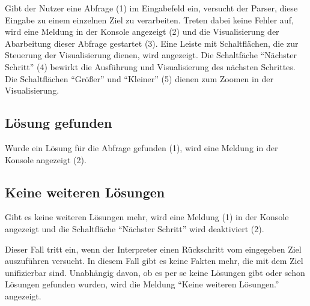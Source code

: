 \documentclass[parskip=full,11pt,twoside]{scrartcl}
\begin{document}
\begin{minipage}{\linewidth}
\end{minipage}

Gibt der Nutzer eine Abfrage (1) im Eingabefeld ein, versucht der Parser, diese Eingabe zu einem einzelnen Ziel zu verarbeiten.
Treten dabei keine Fehler auf, wird eine Meldung in der Konsole angezeigt (2) und die Visualisierung der Abarbeitung dieser Abfrage gestartet (3).
Eine Leiste mit Schaltflächen, die zur Steuerung der Visualisierung dienen, wird angezeigt.
Die Schaltfäche \enquote{Nächster Schritt} (4) bewirkt die Ausführung und Visualisierung des nächsten Schrittes.
Die Schaltflächen \enquote{Größer} und \enquote{Kleiner} (5) dienen zum Zoomen in der Visualisierung.

\subsection{Lösung gefunden}

\begin{minipage}{\linewidth}
\end{minipage}

Wurde ein Lösung für die Abfrage gefunden (1), wird eine Meldung in der Konsole angezeigt (2).

\subsection{Keine weiteren Lösungen}

\begin{minipage}{\linewidth}
\end{minipage}

Gibt es keine weiteren Lösungen mehr, wird eine Meldung (1) in der Konsole angezeigt und die Schaltfläche \enquote{Nächster Schritt} wird deaktiviert (2).

Dieser Fall tritt ein, wenn der Interpreter einen Rückschritt vom eingegeben Ziel auszuführen versucht.
In diesem Fall gibt es keine Fakten mehr, die mit dem Ziel unifizierbar sind.
Unabhängig davon, ob es per se keine Lösungen gibt oder schon Lösungen gefunden wurden, wird die Meldung \enquote{Keine weiteren Lösungen.} angezeigt.
\end{document}

